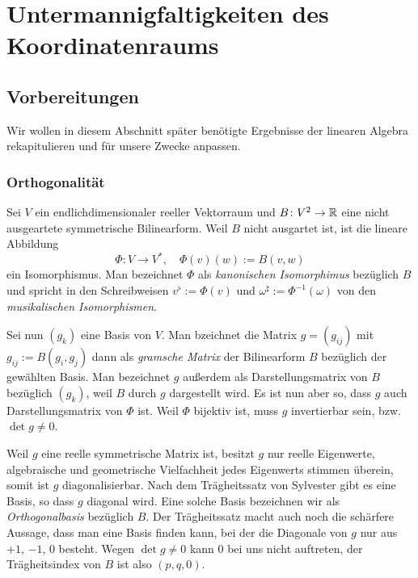 
\chapter{Untermannigfaltigkeiten des Koordinatenraums}

\section{Vorbereitungen}

Wir wollen in diesem Abschnitt später benötigte Ergebnisse der
linearen Algebra rekapitulieren und für unsere Zwecke anpassen.

\subsection{Orthogonalität}

Sei $V$ ein endlichdimensionaler reeller Vektorraum und
$B\colon V^2\to\mathbb R$ eine nicht ausgeartete symmetrische Bilinearform.
Weil $B$ nicht ausgartet ist, ist die lineare Abbildung%
\begin{equation}
\Phi\colon V\to V^*,\quad \Phi(v)(w):=B(v,w)
\end{equation}
ein Isomorphismus. Man bezeichnet $\Phi$ als
\emph{kanonischen Isomorphimus}
bezüglich $B$ und spricht in den Schreibweisen $v^\flat:=\Phi(v)$
und $\omega^\sharp:=\Phi^{-1}(\omega)$ von den \emph{musikalischen
Isomorphismen}.

Sei nun $(g_k)$ eine Basis von $V$. Man bzeichnet die Matrix
$g=(g_{ij})$ mit $g_{ij}:=B(g_i,g_j)$ dann als
\emph{gramsche Matrix}
der Bilinearform $B$ bezüglich der gewählten Basis. Man bezeichnet
$g$ außerdem als Darstellungsmatrix von $B$ bezüglich $(g_k)$,
weil $B$ durch $g$ dargestellt wird. Es ist nun aber so, dass
$g$ auch Darstellungsmatrix von $\Phi$ ist. Weil $\Phi$ bijektiv
ist, muss $g$ invertierbar sein, bzw. $\det g\ne 0$.

Weil $g$ eine reelle symmetrische Matrix ist, besitzt $g$ nur reelle
Eigenwerte, algebraische und geometrische Vielfachheit jedes
Eigenwerts stimmen überein, somit ist $g$ diagonalisierbar.
Nach dem Trägheitssatz von Sylvester gibt es eine Basis, so
dass $g$ diagonal wird. Eine solche Basis bezeichnen wir als
\emph{Orthogonalbasis} bezüglich $B$. Der Trägheitssatz macht auch
noch die schärfere Aussage, dass man eine Basis finden kann, bei der
die Diagonale von $g$ nur aus $+1$, $-1$, $0$ besteht. Wegen
$\det g\ne 0$ kann $0$ bei uns nicht auftreten, der Trägheitsindex von
$B$ ist also $(p,q,0)$.

